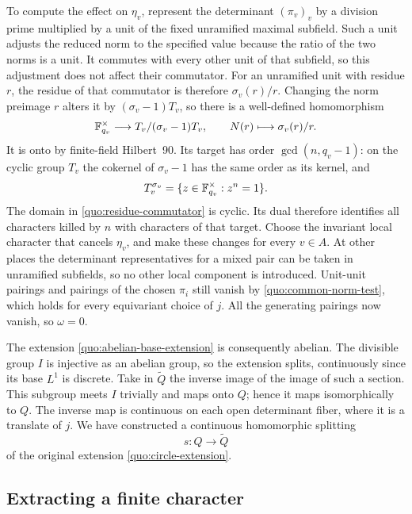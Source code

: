 To compute the effect on $\eta_v$, represent the determinant
$(\pi_v)_v$ by a division prime multiplied by a unit of the fixed
unramified maximal subfield.  Such a unit adjusts the reduced norm to the specified value because
the ratio of the two norms is a unit.  It commutes with every other
unit of that subfield, so this adjustment does not affect their commutator.
For an unramified unit with residue $r$, the residue of that
commutator is therefore $\sigma_v(r)/r$.  Changing the
norm preimage $r$ alters it by $(\sigma_v-1)T_v$, so there is a
well-defined homomorphism
\begin{equation}\label{quo:residue-commutator}
 \mathbb F_{q_v}^\times\longrightarrow T_v/(\sigma_v-1)T_v,
 \qquad N(r)\longmapsto\sigma_v(r)/r.
\end{equation}
It is onto by finite-field Hilbert~90.  Its target has order
$\gcd(n,q_v-1)$: on the cyclic group $T_v$ the cokernel of
$\sigma_v-1$ has the same order as its kernel, and
\[
 T_v^{\sigma_v}=\{z\in\mathbb F_{q_v}^\times:z^n=1\}.
\]
The domain in \eqref{quo:residue-commutator} is cyclic.  Its dual
therefore identifies all characters killed by $n$ with characters
of that target.  Choose the invariant local character that cancels
$\eta_v$, and make these changes for every $v\in A$.
At other places the determinant representatives for a mixed pair can
be taken in unramified subfields, so no other local component is
introduced.  Unit-unit pairings and pairings of the chosen $\pi_i$
still vanish by \eqref{quo:common-norm-test}, which holds for every
equivariant choice of $j$.  All the generating pairings now vanish, so $\omega=0$.

The extension \eqref{quo:abelian-base-extension} is consequently
abelian.  The divisible group $I$ is injective as an abelian group,
so the extension splits, continuously since its base $L^1$ is
discrete.  Take in $\widetilde Q$ the inverse image of the image of
such a section.  This subgroup meets $I$ trivially and maps onto $Q$;
hence it maps isomorphically to $Q$.  The inverse map is continuous
on each open determinant fiber, where it is a translate of $j$.
We have constructed a continuous homomorphic splitting
\begin{equation}\label{quo:full-section}
 s:Q\longrightarrow\widetilde Q
\end{equation}
of the original extension \eqref{quo:circle-extension}.

\subsection{Extracting a finite character}

